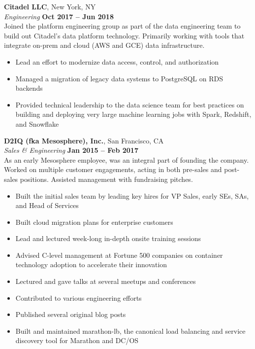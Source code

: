 \documentclass[margin,line]{resume}
\begin{document}
\begin{resume}
    \textbf{Citadel LLC}, New York, NY \vspace{2mm}\\\vspace{1mm}%
    \textsl{Engineering} \hfill \textbf{Oct 2017 -- Jun 2018}\\
    Joined the platform engineering group as part of the data engineering
    team to build out Citadel's data platform technology. Primarily working
    with tools that integrate on-prem and cloud (AWS and GCE) data
    infrastructure.

    \begin{itemize}
        \item Lead an effort to modernize data access, control, and
        authorization
        \item Managed a migration of legacy data systems to PostgreSQL on RDS
        backends
        \item Provided technical leadership to the data science team for best
        practices on building and deploying very large machine learning jobs
        with Spark, Redshift, and Snowflake
    \end{itemize}

    \textbf{D2IQ (fka Mesosphere), Inc.}, San Francisco, CA \vspace{2mm}\\\vspace{1mm}%
    \textsl{Sales \& Engineering} \hfill \textbf{Jan 2015 -- Feb 2017}\\
    As an early Mesosphere employee, was an integral part of founding the
    company.  Worked on multiple customer engagements, acting in both pre-sales
    and post-sales positions. Assisted management with fundraising pitches.

    \begin{itemize}
        \item Built the initial sales team by leading key hires for VP Sales,
        early SEs, SAs, and Head of Services
        \item Built cloud migration plans for enterprise customers
        \item Lead and lectured week-long in-depth onsite training sessions
        \item Advised C-level management at Fortune 500 companies on container
        technology adoption to accelerate their innovation
        \item Lectured and gave talks at several meetups and conferences
        \item Contributed to various engineering efforts
        \item Published several original blog posts
        \item Built and maintained marathon-lb, the canonical load balancing and
        service discovery tool for Marathon and DC/OS
    \end{itemize}


\end{resume}
\end{document}
